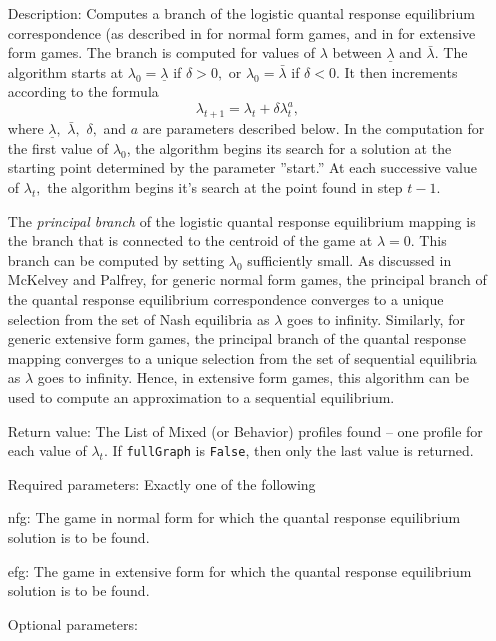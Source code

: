 \begin{itemize}
\bd
\item
[Description:] Computes a branch of the logistic quantal response
equilibrium correspondence (as described in \cite[1995]{McKPal:95a}
for normal form games, and in \cite[1995b]{McKPal:95b} for extensive
form games.  The branch is computed for values of $\lambda$ between
$\underline{\lambda}$ and $\bar{\lambda}.$ The algorithm starts at
$\lambda_0 = \underline{\lambda}$ if $\delta>0,$ or $\lambda_0 =
\bar{\lambda}$ if $\delta<0$. It then increments according to the
formula 
$$
\lambda_{t+1} = \lambda_t +\delta \lambda_t^a,
$$ where $\underline\lambda,$ $\bar\lambda,$ $\delta,$ and $a$ are
parameters described below. In the computation for the first value of
$\lambda_0$, the algorithm begins its search for a solution at the
starting point determined by the parameter ''start.''  At each
successive value of $\lambda_t,$ the algorithm begins it's search at
the point found in step $t - 1.$ 

The {\em principal branch} of the logistic quantal response
equilibrium mapping is the branch that is connected to the centroid of
the game at $\lambda = 0$.  This branch can be computed by setting
$\lambda_0$ sufficiently small.  As discussed in McKelvey and Palfrey,
for generic normal form games, the principal branch of the quantal
response equilibrium correspondence converges to a unique selection
from the set of Nash equilibria as $\lambda$ goes to infinity.
Similarly, for generic extensive form games, the principal branch of
the quantal response mapping converges to a unique selection from the
set of sequential equilibria as $\lambda$ goes to infinity.  Hence, in
extensive form games, this algorithm can be used to compute an
approximation to a sequential equilibrium.
\item
[Return value:] The List of Mixed (or Behavior) profiles found -- one
profile for each value of $\lambda_t$.  If \verb+fullGraph+ is
\verb+False+, then only the last value is returned.  
\item 
[Required parameters:]\hfil\null Exactly one of the following

\bd
\item
[nfg:] The game in normal form for which the quantal response
equilibrium solution is to be
found.
\item	
[efg:] The game in extensive form for which the quantal response
equilibrium solution is to be found.
\ed

\item
[Optional parameters:]\hfil\null


\end{itemize}
